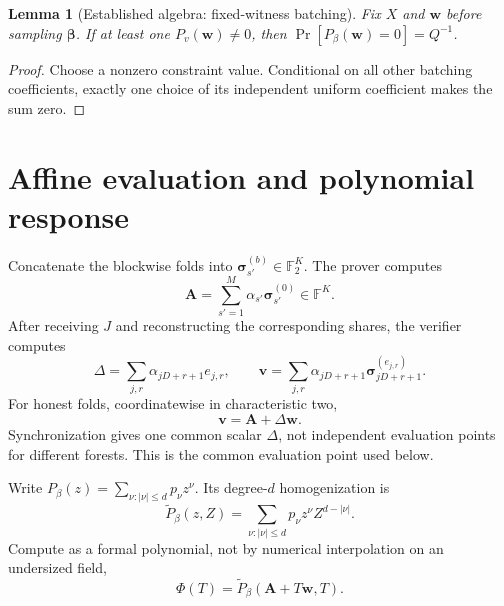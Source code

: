 \documentclass[11pt]{article}
\theoremstyle{plain}
\newtheorem{lemma}[theorem]{Lemma}
\theoremstyle{definition}
\theoremstyle{remark}
\newcommand{\F}{\mathbb F}
\newcommand{\Ftwo}{\mathbb F_2}
\begin{document}
\begin{lemma}[Established algebra: fixed-witness batching]\label{lem:batch}
Fix $X$ and $\mathbf w$ before sampling $\boldsymbol\beta$. If at least one
$P_v(\mathbf w)\ne0$, then
$\Pr[P_\beta(\mathbf w)=0]=Q^{-1}$.
\end{lemma}
\begin{proof}
Choose a nonzero constraint value. Conditional on all other batching
coefficients, exactly one choice of its independent uniform coefficient
makes the sum zero.
\end{proof}

\section{Affine evaluation and polynomial response}\label{sec:poly}
Concatenate the blockwise folds into
$\boldsymbol\sigma_{s'}^{(b)}\in\Ftwo^K$.
The prover computes
\begin{equation}
 \mathbf A=\sum_{s'=1}^M\alpha_{s'}\boldsymbol\sigma_{s'}^{(0)}\in\F^K.
\end{equation}
After receiving $J$ and reconstructing the corresponding shares, the verifier
computes
\begin{equation}\label{eq:affine}
 \Delta=\sum_{j,r}\alpha_{jD+r+1}e_{j,r},\qquad
 \mathbf v=\sum_{j,r}\alpha_{jD+r+1}
                 \boldsymbol\sigma_{jD+r+1}^{(e_{j,r})}.
\end{equation}
For honest folds, coordinatewise in characteristic two,
\begin{equation}\label{eq:affineidentity}
 \mathbf v=\mathbf A+\Delta\mathbf w.
\end{equation}
Synchronization gives one common scalar $\Delta$, not independent evaluation
points for different forests. This is the common evaluation point used below.

Write $P_\beta(z)=\sum_{\nu:|\nu|\leq d}p_\nu z^\nu$.
Its degree-$d$ homogenization is
\begin{equation}\label{eq:hom}
 \widetilde P_\beta(z,Z)=\sum_{\nu:|\nu|\leq d}p_\nu z^\nu Z^{d-|\nu|}.
\end{equation}
Compute as a formal polynomial, not by numerical interpolation on an
undersized field,
\begin{equation}\label{eq:phi}
 \Phi(T)=\widetilde P_\beta(\mathbf A+T\mathbf w,T).
\end{equation}
\end{document}
